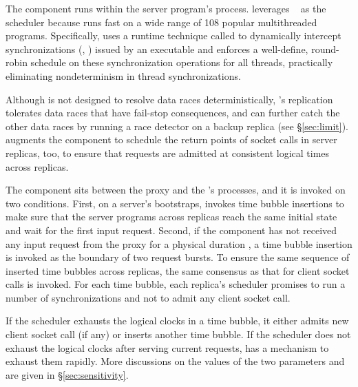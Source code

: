 The \dmt component runs within the server program's process. \xxx leverages 
\parrot~\cite{parrot:sosp13} as the \dmt scheduler because \parrot 
runs fast on a wide range of 108 popular multithreaded programs. Specifically, 
\parrot uses a runtime technique called \ldpreload to dynamically intercept 
\pthread synchronizations (\eg, \mutexlock) issued by an executable and 
enforces a well-define, round-robin schedule on these synchronization 
operations for all threads, practically eliminating nondeterminism in thread 
synchronizations.

Although \parrot is not designed to resolve data races
deterministically, \xxx's replication tolerates data races that have
fail-stop consequences, and can further catch the
other data races by running a race detector on a backup replica (see
\S\ref{sec:limit}).  \xxx augments the \dmt component to schedule the
return points of socket calls in server replicas, too, to ensure that
requests are admitted at consistent logical times across replicas.

The \timealgo component sits between the proxy and the \dmt's processes, and it 
is invoked on two conditions. First, on a server's bootstraps, \xxx invokes 
time bubble insertions to make sure that the server programs across replicas 
reach the same initial state and wait for the first input request. Second, if 
the \dmt component has not received any input request from the proxy for a 
physical duration \ntimeout, a time bubble insertion is invoked as the boundary 
of two request bursts. To ensure the same sequence of inserted time bubbles 
across replicas, the same \paxos consensus as that for client socket calls is 
invoked. For each time bubble, each replica's \dmt scheduler promises to run a 
number of \nclock synchronizations and not to admit any 
client socket call.

If the \dmt scheduler exhausts the logical clocks in a time bubble, it either 
admits new client socket call (if any) or inserts another time bubble. If the 
scheduler does not exhaust the logical clocks after serving current requests, 
\parrot has a mechanism to exhaust them rapidly. More discussions on the values 
of the two parameters \ntimeout and \nclock are given in 
\S\ref{sec:sensitivity}.




